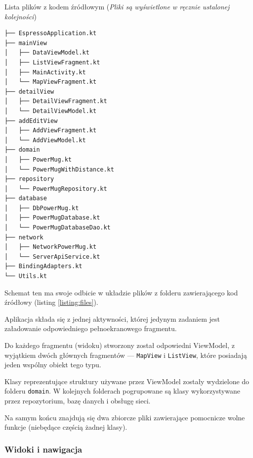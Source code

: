 \documentclass[polish,polish,a4paper,12pt]{article}
\begin{document}
		\begin{listing}[H]
			\caption{Lista plików z kodem źródłowym (\textit{Pliki są wyświetlone w ręcznie ustalonej kolejności})}
			\begin{verbatim}
├── EspressoApplication.kt
├── mainView
│   ├── DataViewModel.kt
│   ├── ListViewFragment.kt
│   ├── MainActivity.kt
│   └── MapViewFragment.kt
├── detailView
│   ├── DetailViewFragment.kt
│   └── DetailViewModel.kt
├── addEditView
│   ├── AddViewFragment.kt
│   └── AddViewModel.kt
├── domain
│   ├── PowerMug.kt
│   └── PowerMugWithDistance.kt
├── repository
│   └── PowerMugRepository.kt
├── database
│   ├── DbPowerMug.kt
│   ├── PowerMugDatabase.kt
│   └── PowerMugDatabaseDao.kt
├── network
│   ├── NetworkPowerMug.kt
│   └── ServerApiService.kt
├── BindingAdapters.kt
└── Utils.kt
			\end{verbatim}
			\label{listing:files}
		\end{listing}

		Schemat ten ma swoje odbicie w układzie plików z folderu zawierającego kod źródłowy (listing \ref{listing:files}).

		Aplikacja składa się z jednej aktywności, której jedynym zadaniem jest załadowanie odpowiedniego pełnoekranowego fragmentu.

		Do każdego fragmentu (widoku) stworzony został odpowiedni ViewModel, z wyjątkiem dwóch głównych fragmentów — \texttt{MapView} i \texttt{ListView}, które posiadają jeden wspólny obiekt tego typu.

		Klasy reprezentujące struktury używane przez ViewModel zostały wydzielone do folderu \texttt{domain}. W kolejnych folderach pogrupowane są klasy wykorzystywane przez repozytorium, bazę danych i obsługę sieci.

		Na samym końcu znajdują się dwa zbiorcze pliki zawierające pomocnicze wolne funkcje (niebędące częścią żadnej klasy).


		\subsubsection{Widoki i nawigacja}
\end{document}
